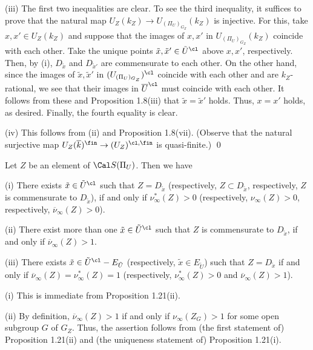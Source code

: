 \noindent
(iii) The first two inequalities are clear. To see the third inequality, 
it suffices to prove that the natural 
map $U_{Z}(k_Z)\to U_{(\Pi_U)_{G_Z}}(k_Z)$ is injective. 
For this, take $x,x'\in U_{Z}(k_Z)$ and suppose that the images of 
$x,x'$ in $U_{(\Pi_U)_{G_Z}}(k_Z)$ coincide with each other. 
Take the unique points ${\tilde x},{\tilde x}'\in {\tilde U}^{\cl}$ 
above $x,x'$, respectively. Then, by (i), $D_{\tilde x}$ 
and $D_{{\tilde x}'}$ are commensurate to each other. 
On the other hand, since the images of ${\tilde x}, {\tilde x}'$ in 
$(U_{(\Pi_U)_{G_Z}})^{\cl}$ coincide with each other and are $k_Z$-rational, 
we see that their images in ${\overline U}^{\cl}$ must coincide 
with each other. It follows from these and Proposition 1.8(iii) that 
${\tilde x}={\tilde x}'$ holds. Thus, $x=x'$ holds, as desired. 
Finally, the fourth equality is clear. 

\noindent
(iv) This follows from (ii) and Proposition 1.8(vii). 
(Observe that the natural surjective map 
$U_Z(\overline{k})^{\fin}\to(U_Z)^{\cl,\fin}$ 
is quasi-finite.) \qed
\enddemo

Let $Z$ be an element of ${\Cal S}(\Pi_U)$. Then we have 

\noindent
{\rm (i)} 
There exists ${\tilde x}\in {\tilde U}^{\cl}$ such that $Z=D_{\tilde x}$
(respectively, $Z\subset D_{\tilde x}$, respectively, $Z$ is commensurate to $D_{\tilde x}$), 
if and only if $\nu_\infty^\ast(Z)>0$ 
(respectively, $\nu_{\infty}(Z)>0$, respectively, ${\overline\nu}_\infty(Z)>0$). 

\noindent
{\rm (ii)} 
There exist more than one ${\tilde x}\in {\tilde U}^{\cl}$ such that 
$Z$ is commensurate to $D_{\tilde x}$, 
if and only if ${\overline\nu}_\infty(Z)>1$. 

\noindent
{\rm (iii)} There exists ${\tilde x}\in {\tilde U}^{\cl}-E_{\tilde U}$ 
(respectively, ${\tilde x}\in E_{\tilde U}$) 
such that $Z=D_{\tilde x}$
if and only if ${\overline\nu}_{\infty}(Z)=\nu_\infty^\ast(Z)=1$ 
(respectively, $\nu^\ast_{\infty}(Z)>0$ and ${\overline\nu}_\infty(Z)>1$). 
\endproclaim

(i) This is immediate from Proposition 1.21(ii). 

\noindent
(ii) By definition, ${\overline\nu}_\infty(Z)>1$ if and only if 
$\nu_{\infty}(Z_G)>1$ for some open subgroup $G$ of $G_Z$. Thus, 
the assertion follows from (the first statement of) 
Proposition 1.21(ii) and (the uniqueness statement of) 
Proposition 1.21(i). 

